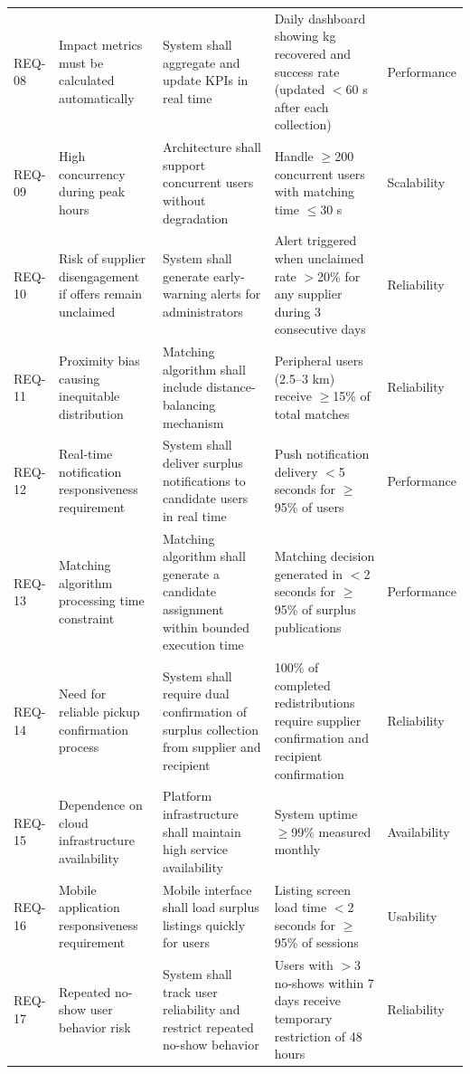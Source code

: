 \documentclass[conference]{IEEEtran}
\begin{document}
\begin{table}[ht]
\begin{tabular}{p{1.1cm} p{3.0cm} p{4.0cm} p{4.0cm} p{1.8cm}}
REQ-08 & Impact metrics must be calculated automatically & System shall aggregate and update KPIs in real time & Daily dashboard showing kg recovered and success rate (updated $<$60 s after each collection) & Performance \\[4pt]
REQ-09 & High concurrency during peak hours & Architecture shall support concurrent users without degradation & Handle $\geq$200 concurrent users with matching time $\leq$30 s & Scalability \\[4pt]
REQ-10 & Risk of supplier disengagement if offers remain unclaimed & System shall generate early-warning alerts for administrators & Alert triggered when unclaimed rate $>$20\% for any supplier during 3 consecutive days & Reliability \\[4pt]
REQ-11 & Proximity bias causing inequitable distribution & Matching algorithm shall include distance-balancing mechanism & Peripheral users (2.5–3 km) receive $\geq$15\% of total matches & Reliability \\[4pt]
REQ-12 & Real-time notification responsiveness requirement & System shall deliver surplus notifications to candidate users in real time & Push notification delivery $<$5 seconds for $\geq$95\% of users & Performance \\[4pt]
REQ-13 & Matching algorithm processing time constraint & Matching algorithm shall generate a candidate assignment within bounded execution time & Matching decision generated in $<$2 seconds for $\geq$95\% of surplus publications & Performance \\[4pt]
REQ-14 & Need for reliable pickup confirmation process & System shall require dual confirmation of surplus collection from supplier and recipient & 100\% of completed redistributions require supplier confirmation and recipient confirmation & Reliability \\[4pt]
REQ-15 & Dependence on cloud infrastructure availability & Platform infrastructure shall maintain high service availability & System uptime $\geq$99\% measured monthly & Availability \\[4pt]
REQ-16 & Mobile application responsiveness requirement & Mobile interface shall load surplus listings quickly for users & Listing screen load time $<$2 seconds for $\geq$95\% of sessions & Usability \\[4pt]
REQ-17 & Repeated no-show user behavior risk & System shall track user reliability and restrict repeated no-show behavior & Users with $>$3 no-shows within 7 days receive temporary restriction of 48 hours & Reliability \\
\bottomrule
\end{tabular}
\end{table}
\end{document}
